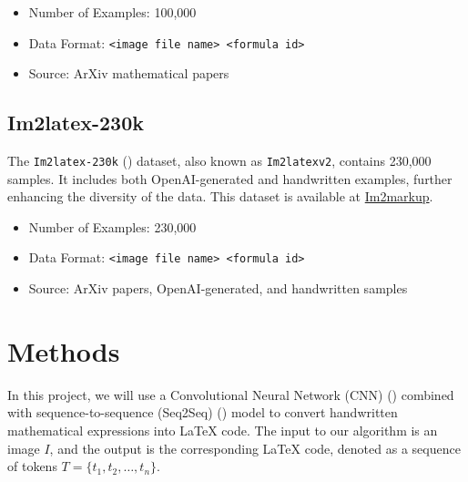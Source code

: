 \documentclass{article}
\begin{document}
\begin{itemize}
    \item Number of Examples: 100,000
    \item Data Format: \texttt{<image file name> <formula id>}
    \item Source: ArXiv mathematical papers
\end{itemize}

\subsection*{Im2latex-230k}
The \texttt{Im2latex-230k} (\cite{gervais2024mathwritingdatasethandwrittenmathematical}) 
 dataset, also known as \texttt{Im2latexv2}, contains 230,000 samples. It includes both OpenAI-generated and handwritten examples, further enhancing the diversity of the data. This dataset is available at \href{https://im2markup.yuntiandeng.com/data/}{Im2markup}.

\begin{itemize}
    \item Number of Examples: 230,000
    \item Data Format: \texttt{<image file name> <formula id>}
    \item Source: ArXiv papers, OpenAI-generated, and handwritten samples
\end{itemize}



\section{ Methods }
In this project, we will use a Convolutional Neural Network (CNN) (\cite{OSheaN15}) combined with sequence-to-sequence (Seq2Seq) (\cite{6795963}) model to convert handwritten mathematical expressions into LaTeX code. The input to our algorithm is an image  \( I \), and the output is the corresponding LaTeX code, denoted as a sequence of tokens \( T = \{t_1, t_2, \dots, t_n\} \).
\end{document}

